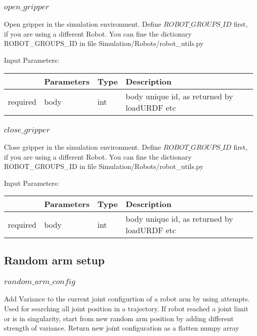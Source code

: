 \documentclass[
	ngerman,
	accentcolor=9c,%
	type=intern,
	marginpar=false
	]{tudapub}
\begin{document}
\subsubsection{$open\_gripper$}
\noindent Open gripper in the simulation environment. Define $ROBOT\_GROUPS\_ID$ first, if you are using a different Robot. You can fine the dictionary ROBOT\_GROUPS\_ID in file Simulation/Robots/robot\_utils.py

\vspace{0.5cm}
\noindent Input Parameters:
\vspace{0.5cm}

\begin{tabular}{|p{}|p{}|p{}| p{}|}
\hline
 & \textbf{Parameters} & \textbf{Type} & \textbf{Description} \\
\hline
required & body & int & body unique id, as returned by loadURDF etc \\
\hline
\end{tabular}
\vspace{1cm}


\subsubsection{$close\_gripper$}
\noindent Close gripper in the simulation environment. Define $ROBOT\_GROUPS\_ID$ first, if you are using a different Robot. You can fine the dictionary ROBOT\_GROUPS\_ID in file Simulation/Robots/robot\_utils.py

\vspace{0.5cm}
\noindent Input Parameters:
\vspace{0.5cm}

\begin{tabular}{|p{}|p{}|p{}| p{}|}
\hline
 & \textbf{Parameters} & \textbf{Type} & \textbf{Description} \\
\hline
required & body & int & body unique id, as returned by loadURDF etc \\
\hline
\end{tabular}
\vspace{1cm}


\subsection{Random arm setup}

\subsubsection{$random\_arm\_config$}
\noindent Add Variance to the current joint configurtion of a robot arm by using attempts. Used for searching all joint position in a trajectory. If robot reached a joint limit or is in singularity, start from new random arm position by adding different strength of variance. Return new joint configuration as a flatten numpy array
\end{document}
